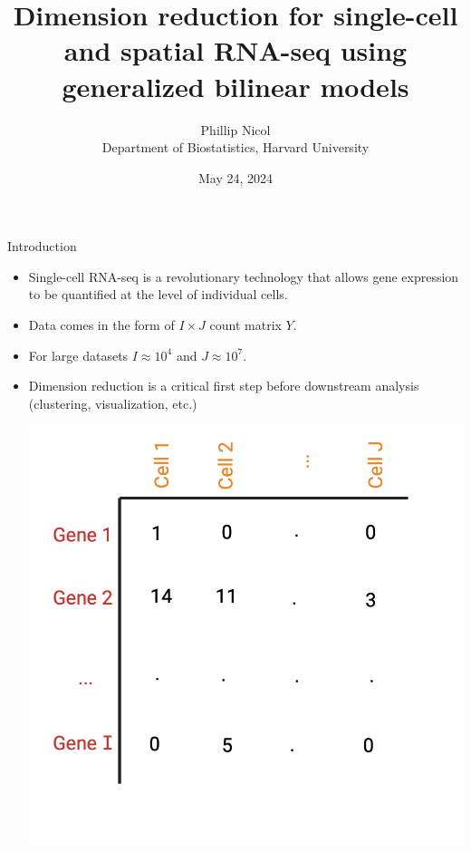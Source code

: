 \documentclass[aspectratio=43]{beamer}
\title{Dimension reduction for single-cell and spatial RNA-seq using generalized bilinear models}
\author{\texorpdfstring{Phillip Nicol \\ Department of Biostatistics, Harvard University}{}}
\institute{NESS 2024 (Storrs, CT)}
\date{May 24, 2024}
\begin{document}
\titlepage

\begin{frame}{Introduction}

\begin{itemize}
\item Single-cell RNA-seq is a revolutionary technology that allows gene expression to be quantified at the level of individual cells. 

\item Data comes in the form of $I \times J$ count matrix $Y$. 

\item For large datasets $I \approx 10^4$ and $J \approx 10^7$. 

\item Dimension reduction is a critical first step before downstream analysis (clustering, visualization, etc.) 

\centering
\includegraphics[scale=0.6]{Fig/counts.png}

\end{itemize}
\end{frame}
\end{document}
